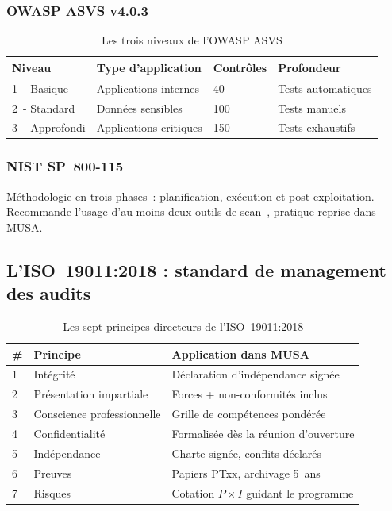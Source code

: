 \documentclass[12pt,a4paper,oneside]{report}
\begin{document}
\subsubsection{OWASP ASVS v4.0.3}
\begin{table}[H]
\centering\small
\caption{Les trois niveaux de l'OWASP ASVS}
\label{tab:owasp}
\begin{tabularx}{\textwidth}{p{3cm}p{4cm}p{2.5cm}X}
\toprule
\rowcolor{theadcolor}
\color{white}\textbf{Niveau} &
\color{white}\textbf{Type d'application} &
\color{white}\textbf{Contr\^oles} &
\color{white}\textbf{Profondeur} \\
\midrule
1~- Basique & Applications internes & 40 & Tests automatiques \\
2~- Standard & Donn\'ees sensibles & 100 & Tests manuels \\
3~- Approfondi & Applications critiques & 150 & Tests exhaustifs \\
\bottomrule
\end{tabularx}
\end{table}

\subsubsection{NIST SP~800-115}
M\'ethodologie en trois phases~: planification, ex\'ecution et post-exploitation.
Recommande l'usage d'au moins deux outils de scan~, pratique reprise dans MUSA.

\subsection{L'ISO~19011:2018 : standard de management des audits}

\begin{table}[H]
\centering\small
\caption{Les sept principes directeurs de l'ISO~19011:2018}
\label{tab:iso19011}
\begin{tabularx}{\textwidth}{p{0.6cm}p{4.5cm}X}
\toprule
\rowcolor{theadcolor}
\color{white}\textbf{\#} &
\color{white}\textbf{Principe} &
\color{white}\textbf{Application dans MUSA} \\
\midrule
1 & Int\'egrit\'e & D\'eclaration d'ind\'ependance sign\'ee \\
2 & Pr\'esentation impartiale & Forces + non-conformit\'es inclus \\
3 & Conscience professionnelle & Grille de comp\'etences pond\'er\'ee \\
4 & Confidentialit\'e & Formalis\'ee d\`es la r\'eunion d'ouverture \\
5 & Ind\'ependance & Charte sign\'ee, conflits d\'eclar\'es \\
6 & Preuves & Papiers PTxx, archivage 5~ans \\
7 & Risques & Cotation $P{\times}I$ guidant le programme \\
\bottomrule
\end{tabularx}
\end{table}
\end{document}
